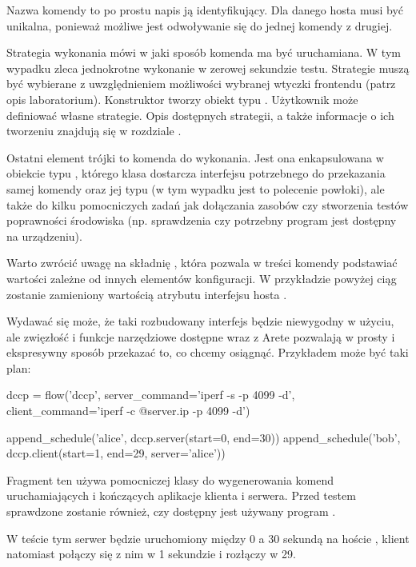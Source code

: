 \documentclass[00-praca-magisterska.tex]{subfiles}
\begin{document}
Nazwa komendy to po prostu napis ją identyfikujący. Dla danego hosta musi być
unikalna, ponieważ możliwe jest odwoływanie się do jednej komendy z drugiej.

Strategia wykonania mówi w jaki sposób komenda ma być uruchamiana. W tym
wypadku  zleca jednokrotne wykonanie w zerowej sekundzie testu.
Strategie muszą być wybierane z uwzględnieniem możliwości wybranej wtyczki
frontendu (patrz opis laboratorium). Konstruktor  tworzy obiekt typu
. Użytkownik może definiować własne strategie. Opis dostępnych
strategii, a także informacje o ich tworzeniu znajdują się w rozdziale
.

Ostatni element trójki to komenda do wykonania. Jest ona enkapsulowana w
obiekcie typu , którego klasa dostarcza interfejsu
potrzebnego do przekazania samej komendy oraz jej typu (w tym wypadku jest to
polecenie powłoki), ale także do kilku pomocniczych zadań jak dołączania
zasobów czy stworzenia testów poprawności środowiska (np. sprawdzenia czy
potrzebny program jest dostępny na urządzeniu).

Warto zwrócić uwagę na składnię , która pozwala w treści komendy
podstawiać wartości zależne od innych elementów konfiguracji. W przykładzie
powyżej ciąg  zostanie zamieniony wartością atrybutu
 interfejsu  hosta .

Wydawać się może, że taki rozbudowany interfejs będzie niewygodny w użyciu, ale
zwięzłość i funkcje narzędziowe dostępne wraz z Arete pozwalają w prosty i
ekspresywny sposób przekazać to, co chcemy osiągnąć. Przykładem może być taki
plan:

\begin{pythoncode}
  dccp = flow('dccp',
      server_command='iperf -s -p 4099 -d',
      client_command='iperf -c @{server.ip} -p 4099 -d')

  append_schedule('alice', dccp.server(start=0, end=30))
  append_schedule('bob',   dccp.client(start=1, end=29, server='alice'))
\end{pythoncode}

Fragment ten używa pomocniczej klasy  do wygenerowania komend
uruchamiających i kończących aplikacje klienta i serwera. Przed testem
sprawdzone zostanie również, czy dostępny jest używany program .

W teście tym serwer będzie uruchomiony między 0 a 30 sekundą na
hoście , klient natomiast połączy się z nim w 1 sekundzie i rozłączy
w 29.
\end{document}
